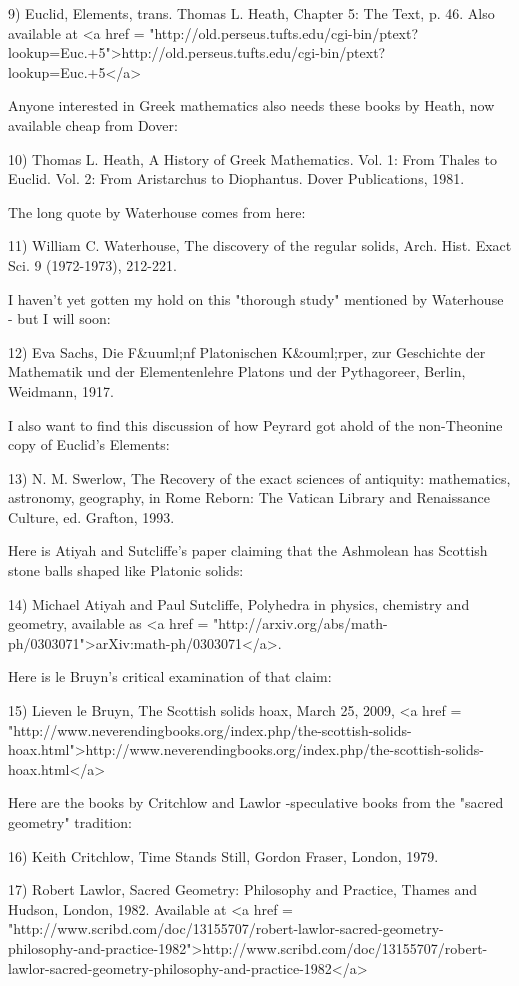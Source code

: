 9) Euclid, Elements, trans. Thomas L. Heath, Chapter 5: The Text,
p. 46.  Also available at
<a href = "http://old.perseus.tufts.edu/cgi-bin/ptext?lookup=Euc.+5">http://old.perseus.tufts.edu/cgi-bin/ptext?lookup=Euc.+5</a>

Anyone interested in Greek mathematics also needs these books by
Heath, now available cheap from Dover:

10) Thomas L. Heath, A History of Greek Mathematics. Vol. 1: From
Thales to Euclid.  Vol. 2: From Aristarchus to Diophantus.  
Dover Publications, 1981.  

The long quote by Waterhouse comes from here:

11) William C. Waterhouse, The discovery of the regular solids,
Arch. Hist. Exact Sci. 9 (1972-1973), 212-221. 

I haven't yet gotten my hold on this "thorough study" mentioned by
Waterhouse - but I will soon:

12) Eva Sachs, Die F&uuml;nf Platonischen K&ouml;rper, zur Geschichte der 
Mathematik und der Elementenlehre Platons und der Pythagoreer, 
Berlin, Weidmann, 1917.

I also want to find this discussion of how Peyrard got ahold of the 
non-Theonine copy of Euclid's Elements:

13) N. M. Swerlow, The Recovery of the exact sciences of antiquity: 
mathematics, astronomy, geography, in Rome Reborn: The Vatican 
Library and Renaissance Culture, ed. Grafton, 1993.

Here is Atiyah and Sutcliffe's paper claiming that the Ashmolean
has Scottish stone balls shaped like Platonic solids:

14) Michael Atiyah and Paul Sutcliffe, Polyhedra in physics, 
chemistry and geometry, available as <a href = "http://arxiv.org/abs/math-ph/0303071">arXiv:math-ph/0303071</a>.

Here is le Bruyn's critical examination of that claim:

15) Lieven le Bruyn, The Scottish solids hoax, March 25, 2009, 
<a href = "http://www.neverendingbooks.org/index.php/the-scottish-solids-hoax.html">http://www.neverendingbooks.org/index.php/the-scottish-solids-hoax.html</a>

Here are the books by Critchlow and Lawlor -speculative books from
the "sacred geometry" tradition:

16) Keith Critchlow, Time Stands Still, Gordon Fraser, London, 1979.

17) Robert Lawlor, Sacred Geometry: Philosophy and Practice, 
Thames and Hudson, London, 1982.  Available at
<a href = "http://www.scribd.com/doc/13155707/robert-lawlor-sacred-geometry-philosophy-and-practice-1982">http://www.scribd.com/doc/13155707/robert-lawlor-sacred-geometry-philosophy-and-practice-1982</a>

